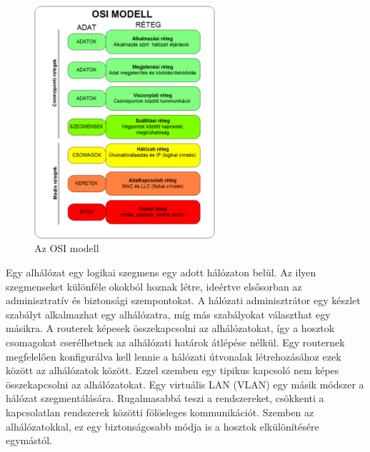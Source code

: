 \begin{figure}[H]
	\centering
	\includegraphics[width=67mm, keepaspectratio]{figures/osi_modell.png}
	\caption{Az OSI modell}
	\label {fig:osi_modell}
\end{figure}

Egy alhálózat egy logikai szegmens egy adott hálózaton belül. Az ilyen szegmenseket
különféle okokból hoznak létre, ideértve elsősorban az adminisztratív és biztonsági
szempontokat. A hálózati adminisztrátor egy készlet szabályt alkalmazhat egy
alhálózatra, míg más szabályokat választhat egy másikra. A routerek képesek
összekapcsolni az alhálózatokat, így a hosztok csomagokat cserélhetnek az
alhálózati határok átlépése nélkül. Egy routernek megfelelően konfigurálva kell
lennie a hálózati útvonalak létrehozásához ezek között az alhálózatok között.
Ezzel szemben egy tipikus kapcsoló nem képes összekapcsolni az alhálózatokat.
Egy virtuális LAN (VLAN) egy másik módszer a hálózat szegmentálására. 
Rugalmasabbá teszi a rendszereket, csökkenti a kapcsolatlan rendszerek közötti fölösleges kommunikációt.
Szemben az alhálózatokkal, ez egy biztonságosabb módja is a hosztok elkülönítésére egymástól.

